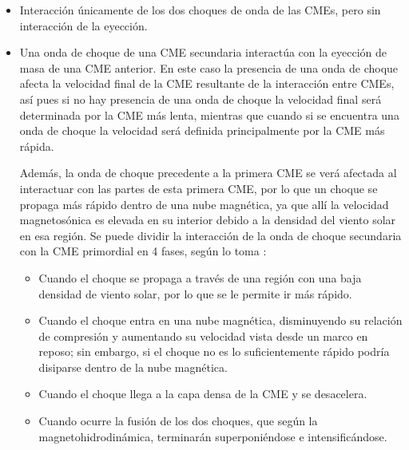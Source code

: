 \begin{itemize}
    \item Interacción únicamente de los dos choques de onda de las CMEs, pero sin interacción de la eyección.
\item Una onda de choque de una \ac{CME} secundaria interactúa con la eyección de masa de una \ac{CME} anterior. En este caso la presencia de una onda de choque afecta la velocidad final de la \ac{CME} resultante de la interacción entre CMEs, así pues si no hay presencia de una onda de choque la velocidad final será determinada por la \ac{CME} más lenta, mientras que cuando si se encuentra una onda de choque la velocidad será definida principalmente por la \ac{CME} más rápida. 


Además, la onda de choque precedente a la primera \ac{CME} se verá afectada al interactuar con las partes de esta primera CME, por lo que un choque se propaga más rápido dentro de una nube magnética, ya que allí la velocidad magnetosónica es elevada en su interior debido a la densidad del viento solar en esa región.
Se puede dividir la interacción de la onda de choque secundaria con la \ac{CME} primordial en 4 fases, según lo toma \cite{lugaz-2017}:
\begin{itemize}
    \item Cuando el choque se propaga a través de una región con una baja densidad de viento solar, por lo que se le permite ir más rápido.
\item Cuando el choque entra en una nube magnética, disminuyendo su relación de compresión y aumentando su velocidad vista desde un marco en reposo; sin embargo, si el choque no es lo suficientemente rápido podría disiparse dentro de la nube magnética.
\item Cuando el choque llega a la capa densa de la \ac{CME} y se desacelera.
\item Cuando ocurre la fusión de los dos choques, que según la magnetohidrodinámica, terminarán superponiéndose e intensificándose. 

\end{itemize}


\end{itemize}
